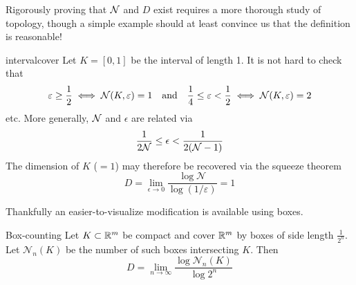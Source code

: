Rigorously proving that $\mathcal{N}$ and $D$ exist requires a more thorough study of topology, though a simple example should at least convince us that the definition is reasonable!

\begin{example}{}{intervalcover}
	Let $K=[0,1]$ be the interval of length 1. It is not hard to check that
	\[
		\varepsilon\ge\frac 12\iff \mathcal{N}(K,\varepsilon)=1\quad\text{and}\quad 
		\frac 14\le \varepsilon<\frac 12\iff \mathcal{N}(K,\varepsilon)=2
	\]
	etc. More generally, $\mathcal{N}$ and $\epsilon$ are related via
	\[
		\frac 1{2\mathcal{N}}\le\epsilon<\frac 1{2(\mathcal{N}-1)}
	\]
	The dimension of $K$ ($=1$) may therefore be recovered via the squeeze theorem
	\[%
		D=\lim_{\epsilon\to 0}\frac{\log\mathcal N}{\log (1/\varepsilon)}=1
	\]
\end{example}



Thankfully an easier-to-visualize modification is available using boxes.

\begin{thm}{Box-counting}{}
	Let $K\subset\mathbb{R}^m$ be compact and cover $\mathbb{R}^m$ by boxes of side length $\frac 1{2^n}$. Let $\mathcal N_n(K)$ be the number of such boxes intersecting $K$. Then
	\[
		D=\lim_{n\to\infty}\frac{\log\mathcal N_n(K)}{\log 2^n}
	\]
\end{thm}


